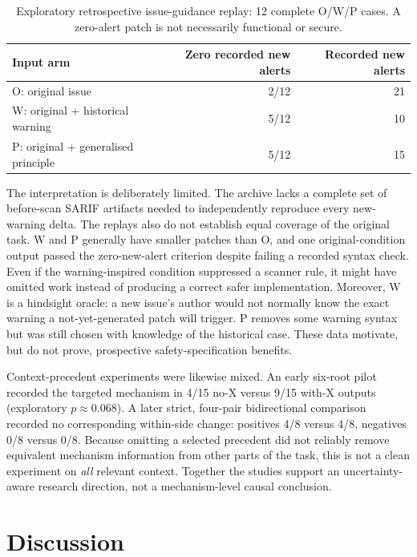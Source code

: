 \documentclass[journal,10pt,twoside]{IEEEtran}
\begin{document}
\begin{table}[t]
\centering\footnotesize
\caption{Exploratory retrospective issue-guidance replay: 12 complete O/W/P cases. A zero-alert patch is not necessarily functional or secure.}
\label{tab:owp}
\begin{tabularx}{\columnwidth}{@{}Xrr@{}}\toprule
\textbf{Input arm} & \textbf{Zero recorded new alerts} & \textbf{Recorded new alerts}\\\midrule
O: original issue & 2/12 & 21\\
W: original + historical warning & 5/12 & 10\\
P: original + generalised principle & 5/12 & 15\\\bottomrule
\end{tabularx}
\end{table}

The interpretation is deliberately limited. The archive lacks a complete set of before-scan SARIF artifacts needed to independently reproduce every new-warning delta. The replays also do not establish equal coverage of the original task. W and P generally have smaller patches than O, and one original-condition output passed the zero-new-alert criterion despite failing a recorded syntax check. Even if the warning-inspired condition suppressed a scanner rule, it might have omitted work instead of producing a correct safer implementation. Moreover, W is a hindsight oracle: a new issue's author would not normally know the exact warning a not-yet-generated patch will trigger. P removes some warning syntax but was still chosen with knowledge of the historical case. These data motivate, but do not prove, prospective safety-specification benefits.

Context-precedent experiments were likewise mixed. An early six-root pilot recorded the targeted mechanism in 4/15 no-X versus 9/15 with-X outputs (exploratory $p\approx0.068$). A later strict, four-pair bidirectional comparison recorded no corresponding within-side change: positives 4/8 versus 4/8, negatives 0/8 versus 0/8. Because omitting a selected precedent did not reliably remove equivalent mechanism information from other parts of the task, this is not a clean experiment on \emph{all} relevant context. Together the studies support an uncertainty-aware research direction, not a mechanism-level causal conclusion.

\section{Discussion}
\end{document}

